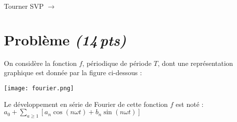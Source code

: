 \documentclass[a4paper,11pt]{article}
\begin{document}
\vspace{2cm}

\begin{flushright}
Tourner SVP $\rightarrow$
\end{flushright}

\newpage
\section{Problème \emph{(14\,pts)}}
On considère la fonction $f$, périodique de période $T$, dont une représentation graphique est donnée par la figure ci-dessous :
\begin{center}
\texttt{[image: fourier.png]}
\end{center}
Le développement en série de Fourier de cette fonction $f$ est noté : $\displaystyle a_0+\sum_{a\geq1}\left[a_n\cos (n\omega t)+b_n\sin(n\omega t)\right]$
\end{document}
